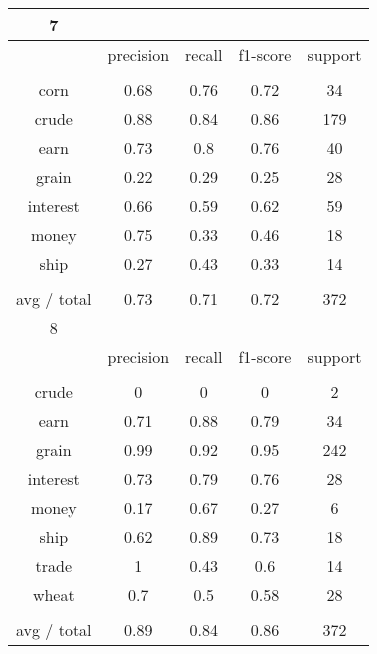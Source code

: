 \documentclass[11pt]{article}
\begin{document}
\begin{center}
\begin{longtable}{| c | c | c | c | c |}
7           &           &        &          &         \\
\hline
           & precision & recall & f1-score & support \\
           &           &        &          &         \\
corn        & 0.68      & 0.76   & 0.72     & 34      \\
crude       & 0.88      & 0.84   & 0.86     & 179     \\
earn        & 0.73      & 0.8    & 0.76     & 40      \\
grain       & 0.22      & 0.29   & 0.25     & 28      \\
interest    & 0.66      & 0.59   & 0.62     & 59      \\
money       & 0.75      & 0.33   & 0.46     & 18      \\
ship        & 0.27      & 0.43   & 0.33     & 14      \\
           &           &        &          &         \\
avg / total & 0.73      & 0.71   & 0.72     & 372     \\
\hline

8           &           &        &          &         \\
\hline
           & precision & recall & f1-score & support \\
           &           &        &          &         \\
crude       & 0         & 0      & 0        & 2       \\
earn        & 0.71      & 0.88   & 0.79     & 34      \\
grain       & 0.99      & 0.92   & 0.95     & 242     \\
interest    & 0.73      & 0.79   & 0.76     & 28      \\
money       & 0.17      & 0.67   & 0.27     & 6       \\
ship        & 0.62      & 0.89   & 0.73     & 18      \\
trade       & 1         & 0.43   & 0.6      & 14      \\
wheat       & 0.7       & 0.5    & 0.58     & 28      \\
           &           &        &          &         \\
avg / total & 0.89      & 0.84   & 0.86     & 372     \\
\hline


\end{longtable}
\end{center}
\end{document}
